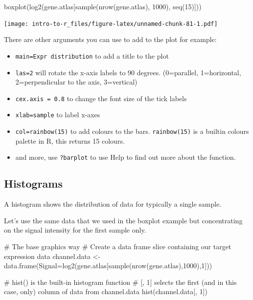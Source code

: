 \documentclass[a4paper]{book}
\newenvironment{Shaded}{}{}
\newcommand{\KeywordTok}[1]{\textcolor[rgb]{0.00,0.00,1.00}{{#1}}}
\newcommand{\DataTypeTok}[1]{{#1}}
\newcommand{\DecValTok}[1]{{#1}}
\newcommand{\StringTok}[1]{\textcolor[rgb]{0.00,0.50,0.50}{{#1}}}
\newcommand{\CommentTok}[1]{\textcolor[rgb]{0.00,0.50,0.00}{{#1}}}
\newcommand{\NormalTok}[1]{{#1}}
\providecommand{\tightlist}{%
  \setlength{\itemsep}{0pt}\setlength{\parskip}{0pt}}
\newlength{\leftbarwidth}
\newlength{\leftbarsep}
\newcommand*{\leftbarcolorcmd}{\color{darkgray}}%
\renewenvironment{leftbar}{%
    \def\FrameCommand{{\leftbarcolorcmd{\vrule width \leftbarwidth\relax\hspace {\leftbarsep}}}}%
    \MakeFramed {\advance \hsize -\width \FrameRestore }%
}{%
    \endMakeFramed
}
\renewenvironment{Shaded}
{\vspace{0em}\begin{leftbar}\begin{snugshade}}
{\end{snugshade}\end{leftbar}\vspace{0pt}}
\begin{document}
\begin{Shaded}
\begin{Highlighting}[]
\KeywordTok{boxplot}\NormalTok{(}\KeywordTok{log2}\NormalTok{(gene.atlas[}\KeywordTok{sample}\NormalTok{(}\KeywordTok{nrow}\NormalTok{(gene.atlas), }\DecValTok{1000}\NormalTok{), }\KeywordTok{seq}\NormalTok{(}\DecValTok{15}\NormalTok{)]))}
\end{Highlighting}
\end{Shaded}

\texttt{[image: intro-to-r\_files/figure-latex/unnamed-chunk-81-1.pdf]}

There are other arguments you can use to add to the plot for example:

\begin{itemize}
\tightlist
\item
  \texttt{main=\textquotesingle{}Expr\ distribution\textquotesingle{}}
  to add a title to the plot
\item
  \texttt{las=2} will rotate the x-axis labels to 90 degrees.
  (0=parallel, 1=horizontal, 2=perpendicular to the axis, 3=vertical)
\item
  \texttt{cex.axis\ =\ 0.8} to change the font size of the tick labels
\item
  \texttt{xlab=\textquotesingle{}sample\textquotesingle{}} to label
  x-axes
\item
  \texttt{col=rainbow(15)} to add colours to the bars.
  \texttt{rainbow(15)} is a builtin colours palette in R, this returns
  15 colours.
\item
  and more, use \texttt{?barplot} to use Help to find out more about the
  function.
\end{itemize}

\subsection{Histograms}\label{histograms}

A histogram shows the distribution of data for typically a single
sample.

Let's use the same data that we used in the boxplot example but
concentrating on the signal intensity for the first sample only.

\begin{Shaded}
\begin{Highlighting}[]
\CommentTok{# The base graphics way}
\CommentTok{# Create a data frame slice containing our target expression data}
\NormalTok{channel.data <-}\StringTok{ }\KeywordTok{data.frame}\NormalTok{(}\DataTypeTok{Signal=}\KeywordTok{log2}\NormalTok{(gene.atlas[}\KeywordTok{sample}\NormalTok{(}\KeywordTok{nrow}\NormalTok{(gene.atlas),}\DecValTok{1000}\NormalTok{),}\DecValTok{1}\NormalTok{]))}

\CommentTok{# hist() is the built-in histogram function}
\CommentTok{# [, 1] selects the first (and in this case, only) column of data from channel.data}
\KeywordTok{hist}\NormalTok{(channel.data[, }\DecValTok{1}\NormalTok{])}
\end{Highlighting}
\end{Shaded}
\end{document}
